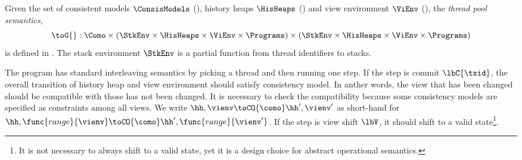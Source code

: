 \begin{defn} 
\label{def:thread_pool_semantics}
\label{def:program_semantics}
Given the set of consistent models \( \ConsisModels \) (), history heaps \(\HisHeaps\) () and view environment \(\ViEnv \) (), the \emph{thread pool semantics}, 
\[
	\toG{} : \Como 
    \times ( \StkEnv \times \HisHeaps \times \ViEnv \times \Programs) 
    \times ( \StkEnv \times \HisHeaps \times \ViEnv \times \Programs) 
\]
is defined in .
The stack environment \( \StkEnv \) is a partial function from thread identifiers to stacks.
\end{defn}
 
The program has standard interleaving semantics by picking a thread and then running one step.
If the step is commit \( \lbC{\txid} \), the overall transition of history heap and view environment should satisfy consistency model.
In anther words, the view that has been changed should be compatible with those has not been changed.
It is necessary to check the compatibility because some consistency models are specified as constraints among all views.
We write \( \hh, \vienv \toCO{\como} \hh', \vienv' \) as short-hand for \( \hh, \func{range}{\vienv} \toCO{\como} \hh', \func{range}{\vienv'} \).
If the step is view shift \( \lbV \), it should shift to a valid state\footnote{It is not necessary to always shift to a valid state, yet it is a design choice for abstract operational semantics.}.
 

